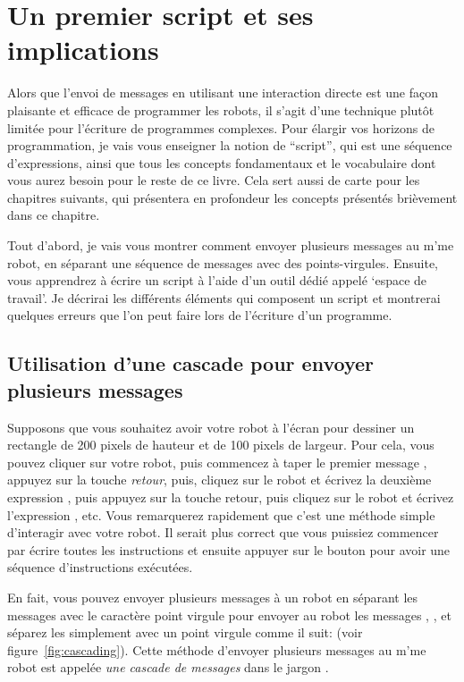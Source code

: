 \documentclass[a4paper,10pt,twoside]{book}
\begin{document}
    \sloppy
\fi

\chapter{Un premier script et ses implications}\label{cha:script}

Alors que l'envoi de messages en utilisant une interaction directe est une fa\c con plaisante et efficace de programmer les robots, il s'agit d'une technique plut\^ot limit\'ee pour l'\'ecriture de programmes complexes. Pour \'elargir vos horizons de programmation, je vais vous enseigner la notion de ``script'', qui est une s\'equence d'expressions, ainsi que tous les concepts fondamentaux et le vocabulaire dont vous aurez besoin pour le reste de ce livre. Cela sert aussi de carte pour les chapitres suivants, qui pr\'esentera en profondeur les concepts pr\'esent\'es bri\`evement dans ce chapitre.

Tout d'abord, je vais vous montrer comment envoyer plusieurs messages au m'me robot, en s\'eparant une s\'equence de messages avec des points-virgules. Ensuite, vous apprendrez \`a \'ecrire un script \`a l'aide d'un outil d\'edi\'e appel\'e `espace de travail'. Je d\'ecrirai les diff\'erents \'el\'ements qui composent un script et  montrerai quelques erreurs que l'on peut faire lors de l'\'ecriture d'un programme.

\newpage 
\section{Utilisation d'une cascade pour envoyer plusieurs messages}

Supposons que vous souhaitez avoir votre robot \`a l'\'ecran pour dessiner un rectangle de 200 pixels de hauteur et de 100 pixels de largeur. Pour cela, vous pouvez cliquer sur votre robot, puis commencez \`a taper le premier message , appuyez sur la touche \emph{retour}, puis, cliquez sur le robot et \'ecrivez la deuxi\`eme expression , puis appuyez sur la touche retour, puis cliquez sur le robot et \'ecrivez l'expression , etc. Vous remarquerez rapidement que c'est une m\'ethode simple d'interagir avec votre robot. Il serait plus correct que vous puissiez commencer par \'ecrire toutes les instructions et ensuite appuyer sur le bouton pour avoir une s\'equence d'instructions ex\'ecut\'ees.

En fait, vous pouvez envoyer plusieurs messages \`a un robot en s\'eparant les messages avec le caract\`ere point virgule\ct{;} pour envoyer au robot les messages , , et  s\'eparez les simplement avec un point virgule comme il suit:  (voir figure~\ref{fig:cascading}). Cette m\'ethode d'envoyer plusieurs messages au m'me robot est appel\'ee \emph{une cascade de messages} dans le jargon \Squeak.
\end{document}
